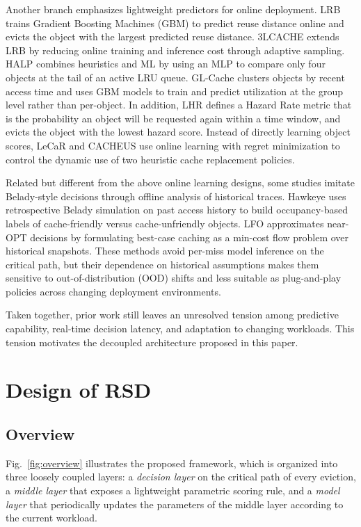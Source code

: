 \documentclass[10pt,journal]{IEEEtran}
\theoremstyle{slantedlemma}
\begin{document}
Another branch emphasizes lightweight predictors for online deployment. LRB \cite{songLRB2020} trains Gradient Boosting Machines (GBM) to predict reuse distance online and evicts the object with the largest predicted reuse distance. 3LCACHE \cite{zhou3Lcache2025} extends LRB by reducing online training and inference cost through adaptive sampling. HALP \cite{songHALP2023} combines heuristics and ML by using an MLP to compare only four objects at the tail of an active LRU queue. GL-Cache \cite{yangGLcache2023} clusters objects by recent access time and uses GBM models to train and predict utilization at the group level rather than per-object. In addition, LHR \cite{yanLHR2021} defines a Hazard Rate metric that is the probability an object will be requested again within a time window, and evicts the object with the lowest hazard score. Instead of directly learning object scores, LeCaR \cite{vietrLeCaR2018} and CACHEUS \cite{rodriguezCACHEUS2021} use online learning with regret minimization to control the dynamic use of two heuristic cache replacement policies.

Related but different from the above online learning designs, some studies imitate Belady-style decisions through offline analysis of historical traces. Hawkeye \cite{jainHawkeye2016} uses retrospective Belady simulation on past access history to build occupancy-based labels of cache-friendly versus cache-unfriendly objects. LFO \cite{bergerLFO2018} approximates near-OPT decisions by formulating best-case caching as a min-cost flow problem over historical snapshots. These methods avoid per-miss model inference on the critical path, but their dependence on historical assumptions makes them sensitive to out-of-distribution (OOD) shifts and less suitable as plug-and-play policies across changing deployment environments.

Taken together, prior work still leaves an unresolved tension among predictive capability, real-time decision latency, and adaptation to changing workloads. This tension motivates the decoupled architecture proposed in this paper.

\section{Design of RSD}\label{sec: scheme}
\subsection{Overview}
Fig.~\ref{fig:overview} illustrates the proposed framework, which is organized into three loosely coupled layers: a \emph{decision layer} on the critical path of every eviction, a \emph{middle layer} that exposes a lightweight parametric scoring rule, and a \emph{model layer} that periodically updates the parameters of the middle layer according to the current workload.
\end{document}
